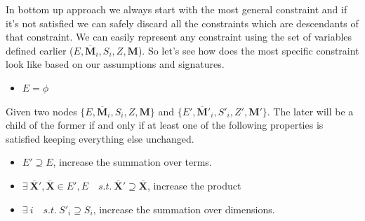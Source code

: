 \documentclass{article}
\newcommand{\TX}{\textbf{X}\xspace}
\newcommand{\TY}{\textbf{Y}\xspace}
\newcommand{\TM}{\textbf{M}\xspace}
\begin{document}
In bottom up approach we always start with the most general constraint and if it's not satisfied we can safely discard all the constraints which are descendants of that constraint. We can easily represent any constraint using the set of variables defined earlier ($E, \overline{\TM}_i,S_{i}, Z, \TM$). So let's see how does the most specific constraint look like based on our assumptions and signatures.
\begin{itemize}
\item $E=\phi$
\end{itemize}
Given two nodes $\{E, \overline{\TM}_i,S_{i}, Z, \TM\}$ and $\{E', \overline{\TM}'_i,S'_{i}, Z', \TM' \}$. The later will be a child of the former if and only if at least one of the following properties is satisfied keeping everything else unchanged.
\begin{itemize}
\item $E' \supseteq E$, increase the summation over terms.
\item $\exists \ \overline{\TX}',\overline{\TX} \in E',E \quad s.t. \  \overline{\TX}' \supseteq \overline{\TX}$, increase the product 
\item $\exists \ i \quad s.t. \ S'_i \supseteq S_i$, increase the summation over dimensions.
\end{itemize}
\end{document}
